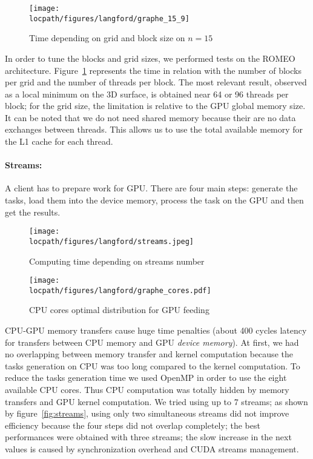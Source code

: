 \begin{figure}[t!]
\centering
\texttt{[image: \\locpath/figures/langford/graphe\_15\_9]}
\caption{Time depending on grid and block size on $n=15$}
\label{f7}
\end{figure}

In order to tune the blocks and grid sizes, we performed tests on the ROMEO architecture. 
Figure~\ref{f7} represents the time in relation with the number of blocks per grid and the number of threads per block. 
The most relevant result, observed as a local minimum on the 3D surface, is obtained near 64 or 96 threads per block; for the grid size, the limitation is relative to the GPU global memory size.
It can be noted that we do not need shared memory because their are no data exchanges between threads. 
This allows us to use the total available memory for the L1 cache for each thread.

\paragraph{Streams:}
A client has to prepare work for GPU. There are four main steps: generate the tasks, load them into the device memory, process the task on the GPU and then get the results.

\begin{figure}[htb]
\begin{minipage}[b]{0.48\linewidth}
\centering
\texttt{[image: \\locpath/figures/langford/streams.jpeg]}
\caption{Computing time depending on streams number}
\label{fig:streams}
\end{minipage}
\hfill
\begin{minipage}[b]{0.48\linewidth}
\centering
\texttt{[image: \\locpath/figures/langford/graphe\_cores.pdf]}
\caption{CPU cores optimal distribution for GPU feeding}\label{cores_rep}
\end{minipage}
\end{figure}

CPU-GPU memory transfers cause huge time penalties (about 400 cycles latency for transfers between CPU memory and GPU \emph{device memory}). 
At first, we had no overlapping between memory transfer and kernel computation because the tasks generation on CPU was too long compared to the kernel computation.
To reduce the tasks generation time we used OpenMP in order to use the eight available CPU cores.
Thus CPU computation was totally hidden by memory transfers and GPU kernel computation. We tried using up to 7 streams; as shown by figure~\ref{fig:streams}, using only two simultaneous streams did not improve efficiency because the four steps did not overlap completely; the best performances were obtained with three streams; the slow increase in the next values is caused by synchronization overhead and CUDA streams management.

